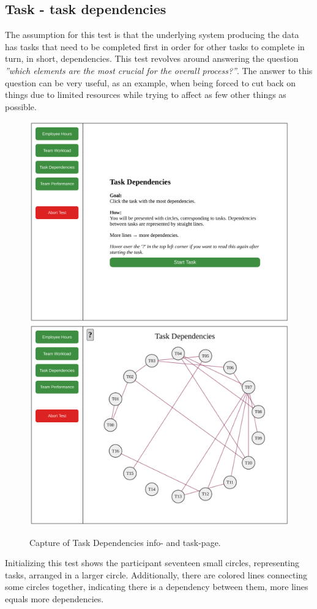 \documentclass[nofilelist,dvipsnames]{cslthse-msc}
\begin{document}
{      \subsection{Task - task dependencies}

        \textit{\ideaThree}

        The assumption for this test is that the underlying system producing
        the data has tasks that need to be completed first in order for other
        tasks to complete in turn, in short, dependencies. This test revolves
        around answering the question
        \textit{''which elements are the most crucial for the overall
          process?''}. The answer to this question can be very useful, as an
        example, when being forced to cut back on things due to limited
        resources while trying to affect as few other things as possible.

        \begin{figure}[h!]
          \centering
          \includegraphics[width=.49\textwidth]{figures/captures/webapp_dependencies_info.pdf}
          \includegraphics[width=.49\textwidth]{figures/captures/webapp_dependencies_task.pdf}
          \caption{Capture of Task Dependencies info- and task-page.}
        \end{figure}

        Initializing this test shows the participant seventeen small circles,
        representing tasks, arranged in a larger circle. Additionally, there are
        colored lines connecting some circles together, indicating there is
        a dependency between them, more lines equals more dependencies.

}
\end{document}
